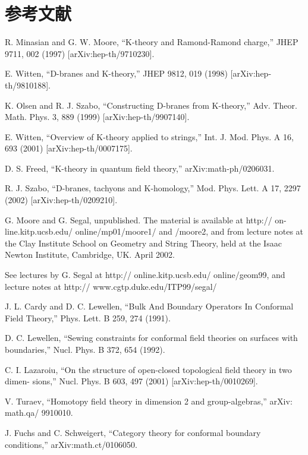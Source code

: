 \documentclass[11pt,a4paper]{ctexart}
\begin{document}
\section*{参考文献}
\par\smallskip
\begin{enumerate}[label={[\arabic*]},leftmargin=*,itemsep=2pt]
\item R. Minasian and G. W. Moore, “K-theory and Ramond-Ramond charge,” JHEP 9711, 002 (1997) [arXiv:hep-th/9710230].
\item E. Witten, “D-branes and K-theory,” JHEP 9812, 019 (1998) [arXiv:hep-th/9810188].
\item K. Olsen and R. J. Szabo, “Constructing D-branes from K-theory,” Adv. Theor. Math. Phys. 3, 889 (1999) [arXiv:hep-th/9907140].
\item E. Witten, “Overview of K-theory applied to strings,” Int. J. Mod. Phys. A 16, 693 (2001) [arXiv:hep-th/0007175].
\item D. S. Freed, “K-theory in quantum field theory,” arXiv:math-ph/0206031.
\item R. J. Szabo, “D-branes, tachyons and K-homology,” Mod. Phys. Lett. A 17, 2297 (2002) [arXiv:hep-th/0209210].
\item G. Moore and G. Segal, unpublished. The material is available at http:// on- line.kitp.ucsb.edu/ online/mp01/moore1/ and /moore2, and from lecture notes at the Clay Institute School on Geometry and String Theory, held at the Isaac Newton Institute, Cambridge, UK. April 2002.
\item See lectures by G. Segal at http:// online.kitp.ucsb.edu/ online/geom99, and lecture notes at http:// www.cgtp.duke.edu/ITP99/segal/
\item J. L. Cardy and D. C. Lewellen, “Bulk And Boundary Operators In Conformal Field Theory,” Phys. Lett. B 259, 274 (1991).
\item D. C. Lewellen, “Sewing constraints for conformal field theories on surfaces with boundaries,” Nucl. Phys. B 372, 654 (1992).
\item C. I. Lazaroiu, “On the structure of open-closed topological field theory in two dimen- sions,” Nucl. Phys. B 603, 497 (2001) [arXiv:hep-th/0010269].
\item V. Turaev, “Homotopy field theory in dimension 2 and group-algebras,” arXiv: math.qa/ 9910010.
\item J. Fuchs and C. Schweigert, “Category theory for conformal boundary conditions,” arXiv:math.ct/0106050.

\end{enumerate}
\end{document}
